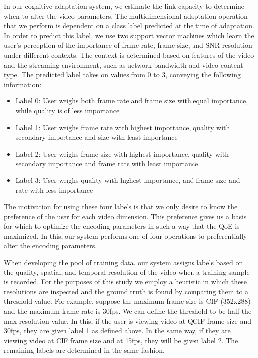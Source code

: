 In our cognitive adaptation system, we estimate the link capacity to determine when to alter the video parameters. The multidimensional adaptation operation that we perform is dependent on a class label predicted at the time of adaptation. In order to predict this label, we use two support vector machines which learn the user’s perception of the importance of frame rate, frame size, and SNR resolution under different contexts. The context is determined based on features of the video and the streaming environment, such as network bandwidth and video content type. The predicted label takes on values from 0 to 3, conveying the following information: 
\begin{itemize}
\item Label 0: User weighs both frame rate and frame size with equal importance, while quality is of less importance
\item Label 1: User weighs frame rate with highest importance, quality with secondary importance and size with least importance
\item Label 2: User weighs frame size with highest importance, quality with secondary importance and frame rate with least importance
\item Label 3: User weighs quality with highest importance, and frame size and rate with less importance
\end{itemize}
The motivation for using these four labels is that we only desire to know the preference of the user for each video dimension. This preference gives us a basis for which to optimize the encoding parameters in such a way that the QoE is maximized. In this, our system performs one of four operations to preferentially alter the encoding parameters. 

When developing the pool of training data. our system assigns labels based on the quality, spatial, and temporal resolution of the video when a training sample is recorded. For the purposes of this study we employ a heuristic in which these resolutions are inspected and the ground truth is found by comparing them to a threshold value. For example, suppose the maximum frame size is CIF (352x288) and the maximum frame rate is 30fps. We can define the threshold to be half the max resolution value. In this, if the user is viewing video at QCIF frame size and 30fps, they are given label 1 as defined above. In the same way, if they are viewing video at CIF frame size and at 15fps, they will be given label 2. The remaining labels are determined in the same fashion.


